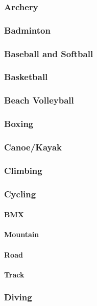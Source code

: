 			\subsubsection{Archery}
			\subsubsection{Badminton}
			\subsubsection{Baseball and Softball}
			\subsubsection{Basketball}
			\subsubsection{Beach Volleyball}
			\subsubsection{Boxing}
			\subsubsection{Canoe/Kayak}
			\subsubsection{Climbing}
			\subsubsection{Cycling}
				\paragraph{BMX}
				\paragraph{Mountain}
				\paragraph{Road}
				\paragraph{Track}
			\subsubsection{Diving}
